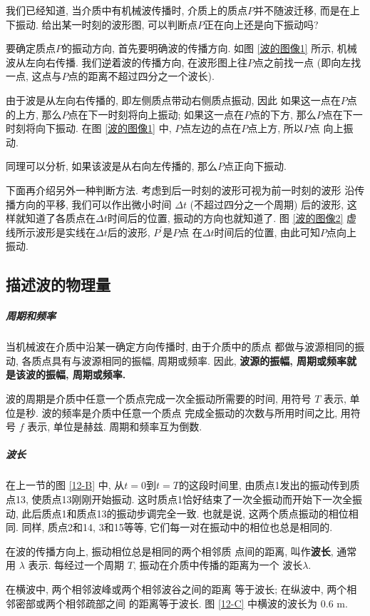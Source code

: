 \documentclass[11pt,a4paper]{ctexbook}
\begin{document}
我们已经知道, 当介质中有机械波传播时, 介质上的质点$P$并不随波迁移,
而是在上下振动. 给出某一时刻的波形图, 可以判断点$P$正在向上还是向下振动吗?

要确定质点$P$的振动方向, 首先要明确波的传播方向. 如图 \ref{波的图像1} 所示,
机械波从左向右传播. 我们逆着波的传播方向, 在波形图上往$P$点之前找一点
(即向左找一点, 这点与$P$点的距离不超过四分之一个波长).

由于波是从左向右传播的, 即左侧质点带动右侧质点振动, 因此
如果这一点在$P$点的上方, 那么$P$点在下一时刻将向上振动;
如果这一点在$P$点的下方, 那么$P$点在下一时刻将向下振动.
在图 \ref{波的图像1} 中, $P$点左边的点在$P$点上方, 所以$P$点
向上振动.

同理可以分析, 如果该波是从右向左传播的, 那么$P$点正向下振动.

下面再介绍另外一种判断方法. 考虑到后一时刻的波形可视为前一时刻的波形
沿传播方向的平移, 我们可以作出微小时间 $\Delta t$ (不超过四分之一个周期)
后的波形, 这样就知道了各质点在$\Delta t$时间后的位置, 振动的方向也就知道了.
图 \ref{波的图像2} 虚线所示波形是实线在$\Delta t$后的波形, $P^{\prime}$是$P$点
在$\Delta t$时间后的位置, 由此可知$P$点向上振动.

\subsection{描述波的物理量}

\subparagraph{周期和频率} 当机械波在介质中沿某一确定方向传播时, 由于介质中的质点
都做与波源相同的振动, 各质点具有与波源相同的振幅, 周期或频率.
因此, \textbf{波源的振幅, 周期或频率就是该波的振幅, 周期或频率. }

波的周期是介质中任意一个质点完成一次全振动所需要的时间,
用符号 $T$ 表示, 单位是秒. 波的频率是介质中任意一个质点
完成全振动的次数与所用时间之比, 用符号 $f$ 表示, 单位是赫兹.
周期和频率互为倒数.

\subparagraph{波长} 在上一节的图 \ref{12-B} 中, 从$t=0$到$t=T$的这段时间里,
由质点1发出的振动传到质点13, 使质点13刚刚开始振动.
这时质点1恰好结束了一次全振动而开始下一次全振动,
此后质点1和质点13的振动步调完全一致. 也就是说,
这两个质点振动的相位相同. 同样, 质点2和14, 3和15等等,
它们每一对在振动中的相位也总是相同的.

在波的传播方向上, 振动相位总是相同的两个相邻质
点间的距离, 叫作\textbf{波长}, 通常用 $\lambda$ 表示.
每经过一个周期 $T$, 振动在介质中传播的距离为一个
波长$\lambda$.

在横波中, 两个相邻波峰或两个相邻波谷之间的距离
等于波长; 在纵波中, 两个相邻密部或两个相邻疏部之间
的距离等于波长. 图 \ref{12-C} 中横波的波长为 0.6 m.
\end{document}
